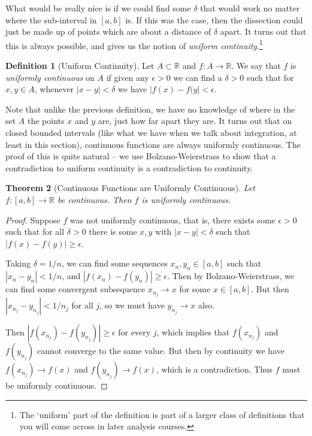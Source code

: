 \documentclass[11pt, a4paper]{article}
\newtheorem{theorem}{Theorem}[section]
\theoremstyle{definition}
\newtheorem{definition}[theorem]{Definition}
\newcommand{\vocab}[1]{\emph{#1}} %
\newcommand{\R}{\mathbb{R}}
\begin{document}
What would be really nice is if we could find some $\delta$ that would work no matter where the sub-interval in $[a, b]$ is. If this was the case, then the dissection could just be made up of points which are about a distance of $\delta$ apart. It turns out that this is always possible, and gives us the notion of \emph{uniform continuity}.\footnote{The `uniform' part of the definition is part of a larger class of definitions that you will come across in later analysis courses.}

\begin{definition}[Uniform Continuity]
	Let $A \subset \R$ and $f: A \rightarrow \R$. We say that $f$ is \vocab{uniformly continuous} on $A$ if given any $\epsilon  >0$ we can find a $\delta> 0$ such that for $x, y \in A$, whenever $|x - y| < \delta$ we have $|f(x) - f(y| < \epsilon$.
\end{definition}

Note that unlike the previous definition, we have no knowledge of where in the set $A$ the points $x$ and $y$ are, just how far apart they are. It turns out that on closed bounded intervals (like what we have when we talk about integration, at least in this section), continuous functions are always uniformly continuous.
The proof of this is quite natural -- we use Bolzano-Weierstrass to show that a contradiction to uniform continuity is a contradiction to continuity.

\begin{theorem}[Continuous Functions are Uniformly Continuous]
	Let $f: [a, b] \rightarrow \R$ be continuous. Then $f$ is uniformly continuous.
\end{theorem}
\begin{proof}
	Suppose $f$ was not uniformly continuous, that is, there exists some $\epsilon > 0$ such that for all $\delta > 0$ there is some $x, y$ with $|x - y| < \delta$ such that $|f(x) - f(y)| \geq \epsilon$.

	Taking $\delta = 1/n$, we can find some sequences $x_n, y_n \in [a, b]$ such that $|x_n - y_n| < 1/n$, and $|f(x_n) - f(y_n)| \geq \epsilon$. Then by Bolzano-Weierstrass, we can find some convergent subsequence $x_{n_j} \rightarrow x$ for some $x \in [a, b]$. But then $|x_{n_j} - y_{n_j}| < 1/n_j$ for all $j$, so we must have $y_{n_j} \rightarrow x$ also.

	Then $|f(x_{n_j}) - f(y_{n_j})| \geq \epsilon$ for every $j$, which implies that $f(x_{n_j})$ and $f(y_{n_j})$ cannot converge to the same value. But then by continuity we have $f(x_{n_j}) \rightarrow f(x)$ and $f(y_{n_j}) \rightarrow f(x)$, which is a contradiction. Thus $f$ must be uniformly continuous.
\end{proof}
\end{document}
